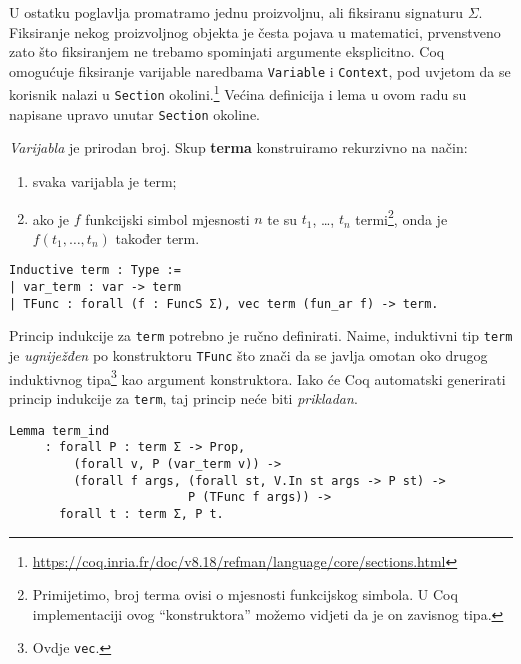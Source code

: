 
\noindent U ostatku poglavlja promatramo jednu proizvoljnu, ali fiksiranu signaturu \(\Sigma\).
Fiksiranje nekog proizvoljnog objekta je česta pojava u matematici,
prvenstveno zato što fiksiranjem ne trebamo spominjati argumente eksplicitno.
Coq omogućuje fiksiranje varijable naredbama \texttt{Variable} i \texttt{Context},
pod uvjetom da se korisnik nalazi u \texttt{Section} okolini.\footnote{\url{https://coq.inria.fr/doc/v8.18/refman/language/core/sections.html}}
Većina definicija i lema u ovom radu su napisane upravo unutar \texttt{Section} okoline.

\begin{definition}\label{def:term}
  \textit{Varijabla} je prirodan broj. Skup \textbf{terma} konstruiramo rekurzivno na način:
  \begin{enumerate}
  \item svaka varijabla je term;
  \item ako je \(f\) funkcijski simbol mjesnosti \(n\) te su \(t_{1}\), \ldots, \(t_{n}\) termi\footnote{Primijetimo, broj terma ovisi o mjesnosti funkcijskog simbola. U Coq implementaciji ovog \enquote{konstruktora} možemo vidjeti da je on zavisnog tipa.},
    onda je \(f(t_{1}, \ldots, t_{n})\) također term.
  \end{enumerate}
\begin{verbatim}
Inductive term : Type :=
| var_term : var -> term 
| TFunc : forall (f : FuncS Σ), vec term (fun_ar f) -> term.
\end{verbatim}
\end{definition}

Princip indukcije za \texttt{term} potrebno je ručno definirati.
Naime, induktivni tip \texttt{term} je \textit{ugniježđen} po konstruktoru \texttt{TFunc} što znači da se
javlja omotan oko drugog induktivnog tipa\footnote{Ovdje \texttt{vec}.} kao argument konstruktora.
Iako će Coq automatski generirati princip indukcije za \texttt{term}, taj princip neće biti \textit{prikladan}.
\begin{verbatim}
Lemma term_ind
     : forall P : term Σ -> Prop,
         (forall v, P (var_term v)) ->
         (forall f args, (forall st, V.In st args -> P st) ->
                         P (TFunc f args)) ->
       forall t : term Σ, P t.
\end{verbatim}


